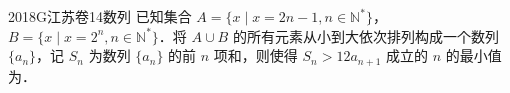 
\begin{problem}{2018}{G}{江苏卷}{14}{数列}
已知集合 $ A = \{x \mid x = 2n - 1, n \in \mathbb{N}^*\} $，$ B = \{x \mid x = 2^n, n \in \mathbb{N}^*\} $．将 $ A \cup B $ 的所有元素从小到大依次排列构成一个数列 $ \{a_n\} $，记 $ S_n $ 为数列 $ \{a_n\} $ 的前 $ n $ 项和，则使得 $ S_n > 12a_{n+1} $ 成立的 $ n $ 的最小值为\underline{\hspace{4em}}．
\end{problem}

\begin{answer}

\end{answer}

\begin{solutions}

\end{solutions}